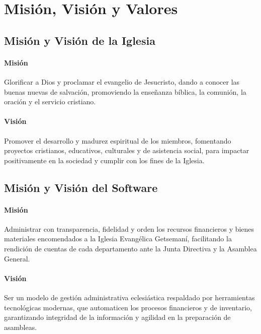 \documentclass[11pt,a4paper]{article}
\begin{document}
	
	
	\section{Misión, Visión y Valores}
	
	\subsection{Misión y Visión de la Iglesia}
	\paragraph{Misión} Glorificar a Dios y proclamar el evangelio de Jesucristo, dando a conocer las buenas nuevas de salvación, promoviendo la enseñanza bíblica, la comunión, la oración y el servicio cristiano.
	
	\paragraph{Visión} Promover el desarrollo y madurez espiritual de los miembros, fomentando proyectos cristianos, educativos, culturales y de asistencia social, para impactar positivamente en la sociedad y cumplir con los fines de la Iglesia.
	
	\subsection{Misión y Visión del Software}
	\paragraph{Misión} Administrar con transparencia, fidelidad y orden los recursos financieros y bienes materiales encomendados a la Iglesia Evangélica Getsemaní, facilitando la rendición de cuentas de cada departamento ante la Junta Directiva y la Asamblea General.
	
	\paragraph{Visión} Ser un modelo de gestión administrativa eclesiástica respaldado por herramientas tecnológicas modernas, que automaticen los procesos financieros y de inventario, garantizando integridad de la información y agilidad en la preparación de asambleas.
	
\end{document}
